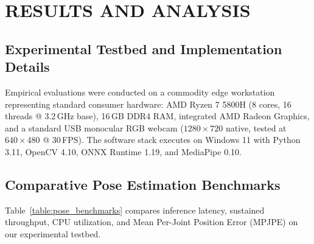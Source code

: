 \documentclass[12pt]{report}
\begin{document}
\begin{table}[htbp]
    \centering
    \caption{REST API Endpoints}
    \label{table:rest_endpoints}
    \footnotesize
\end{table}

\chapter{RESULTS AND ANALYSIS}

\section{Experimental Testbed and Implementation Details}
Empirical evaluations were conducted on a commodity edge workstation representing standard consumer hardware: AMD Ryzen 7 5800H (8 cores, 16 threads @ 3.2\,GHz base), 16\,GB DDR4 RAM, integrated AMD Radeon Graphics, and a standard USB monocular RGB webcam ($1280 \times 720$ native, tested at $640 \times 480$ @ 30\,FPS). The software stack executes on Windows 11 with Python 3.11, OpenCV 4.10, ONNX Runtime 1.19, and MediaPipe 0.10.

\section{Comparative Pose Estimation Benchmarks}
Table~\ref{table:pose_benchmarks} compares inference latency, sustained throughput, CPU utilization, and Mean Per-Joint Position Error (MPJPE) on our experimental testbed.
\end{document}
